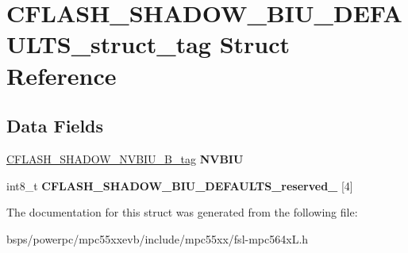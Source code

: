 \hypertarget{structCFLASH__SHADOW__BIU__DEFAULTS__struct__tag}{}\section{C\+F\+L\+A\+S\+H\+\_\+\+S\+H\+A\+D\+O\+W\+\_\+\+B\+I\+U\+\_\+\+D\+E\+F\+A\+U\+L\+T\+S\+\_\+struct\+\_\+tag Struct Reference}
\label{structCFLASH__SHADOW__BIU__DEFAULTS__struct__tag}
\subsection*{Data Fields}
\begin{DoxyCompactItemize}
\item 
\mbox{\label{structCFLASH__SHADOW__BIU__DEFAULTS__struct__tag_adf4776c9a8a51d8ab7439daec5135d69}} 
\mbox{\hyperlink{unionCFLASH__SHADOW__NVBIU__32B__tag}{C\+F\+L\+A\+S\+H\+\_\+\+S\+H\+A\+D\+O\+W\+\_\+\+N\+V\+B\+I\+U\+\_\+B\+\_\+tag}} {\bfseries N\+V\+B\+IU}
\item 
\mbox{\label{structCFLASH__SHADOW__BIU__DEFAULTS__struct__tag_aae7371056d7547df7f8a2367551fec1b}} 
int8\+\_\+t {\bfseries C\+F\+L\+A\+S\+H\+\_\+\+S\+H\+A\+D\+O\+W\+\_\+\+B\+I\+U\+\_\+\+D\+E\+F\+A\+U\+L\+T\+S\+\_\+reserved\+\_} \mbox{[}4\mbox{]}
\end{DoxyCompactItemize}


The documentation for this struct was generated from the following file\+:\begin{DoxyCompactItemize}
\item 
bsps/powerpc/mpc55xxevb/include/mpc55xx/fsl-\/mpc564x\+L.\+h\end{DoxyCompactItemize}
